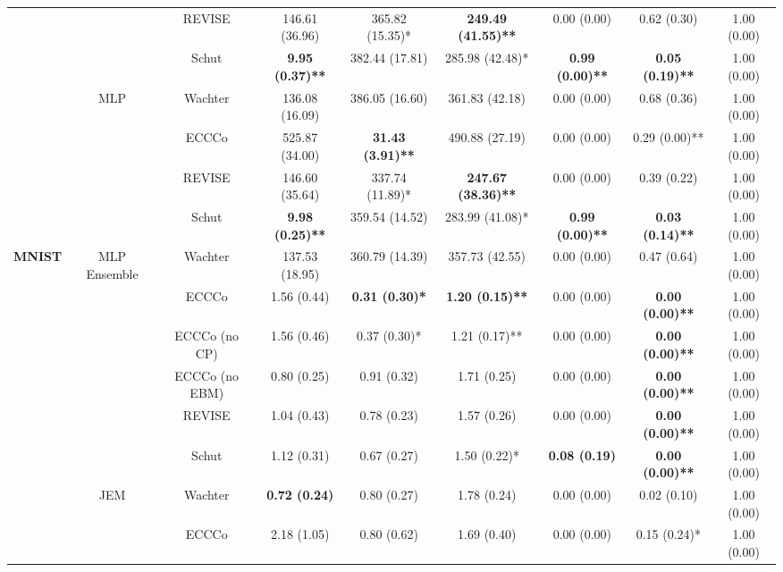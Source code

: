 \begin{table}
{\begin{tabular}[t]{>{}c|c|c|c|c|c|c|c|c}
 &  & REVISE & 146.61 (36.96) & 365.82 (15.35)* & \textbf{249.49 (41.55)**} & 0.00 (0.00) & 0.62 (0.30) & 1.00 (0.00)\\

 &  & Schut & \textbf{9.95 (0.37)**} & 382.44 (17.81) & 285.98 (42.48)* & \textbf{0.99 (0.00)**} & \textbf{0.05 (0.19)**} & 1.00 (0.00)\\

 & \multirow{-4}{*}{\centering\arraybackslash MLP} & Wachter & 136.08 (16.09) & 386.05 (16.60) & 361.83 (42.18) & 0.00 (0.00) & 0.68 (0.36) & 1.00 (0.00)\\
\cline{2-9}
 &  & ECCCo & 525.87 (34.00) & \textbf{31.43 (3.91)**} & 490.88 (27.19) & 0.00 (0.00) & 0.29 (0.00)** & 1.00 (0.00)\\

 &  & REVISE & 146.60 (35.64) & 337.74 (11.89)* & \textbf{247.67 (38.36)**} & 0.00 (0.00) & 0.39 (0.22) & 1.00 (0.00)\\

 &  & Schut & \textbf{9.98 (0.25)**} & 359.54 (14.52) & 283.99 (41.08)* & \textbf{0.99 (0.00)**} & \textbf{0.03 (0.14)**} & 1.00 (0.00)\\

\multirow{-16}{*}{\centering\arraybackslash \textbf{MNIST}} & \multirow{-4}{*}{\centering\arraybackslash MLP Ensemble} & Wachter & 137.53 (18.95) & 360.79 (14.39) & 357.73 (42.55) & 0.00 (0.00) & 0.47 (0.64) & 1.00 (0.00)\\
\cline{1-9}
 &  & ECCCo & 1.56 (0.44) & \textbf{0.31 (0.30)*} & \textbf{1.20 (0.15)**} & 0.00 (0.00) & \textbf{0.00 (0.00)**} & 1.00 (0.00)\\

 &  & ECCCo (no CP) & 1.56 (0.46) & 0.37 (0.30)* & 1.21 (0.17)** & 0.00 (0.00) & \textbf{0.00 (0.00)**} & 1.00 (0.00)\\

 &  & ECCCo (no EBM) & 0.80 (0.25) & 0.91 (0.32) & 1.71 (0.25) & 0.00 (0.00) & \textbf{0.00 (0.00)**} & 1.00 (0.00)\\

 &  & REVISE & 1.04 (0.43) & 0.78 (0.23) & 1.57 (0.26) & 0.00 (0.00) & \textbf{0.00 (0.00)**} & 1.00 (0.00)\\

 &  & Schut & 1.12 (0.31) & 0.67 (0.27) & 1.50 (0.22)* & \textbf{0.08 (0.19)} & \textbf{0.00 (0.00)**} & 1.00 (0.00)\\

 & \multirow{-6}{*}{\centering\arraybackslash JEM} & Wachter & \textbf{0.72 (0.24)} & 0.80 (0.27) & 1.78 (0.24) & 0.00 (0.00) & 0.02 (0.10) & 1.00 (0.00)\\
\cline{2-9}
 &  & ECCCo & 2.18 (1.05) & 0.80 (0.62) & 1.69 (0.40) & 0.00 (0.00) & 0.15 (0.24)* & 1.00 (0.00)\\


\end{tabular}}
\end{table}
